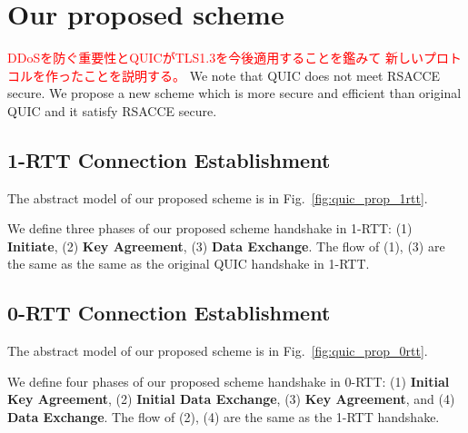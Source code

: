 \section{Our proposed scheme} \label{sec:proposed_scheme}

\textcolor{red} {
	DDoSを防ぐ重要性とQUICがTLS1.3を今後適用することを鑑みて
	新しいプロトコルを作ったことを説明する。
}
We note that QUIC does not meet RSACCE secure.
We propose a new scheme which is more secure and efficient
than original QUIC and it satisfy RSACCE secure.


\subsection{1-RTT Connection Establishment} \label{sec:quic_prop_1rtt}

The abstract model of our proposed scheme is in
Fig.~\ref{fig:quic_prop_1rtt}.



We define three phases of our proposed scheme handshake in 1-RTT:
(1) \textbf{Initiate},
(2) \textbf{Key Agreement},
(3) \textbf{Data Exchange}.
The flow of (1), (3) are the same as the same as the original QUIC
handshake in 1-RTT.



\subsection{0-RTT Connection Establishment} \label{sec:quic_prop_0rtt}

The abstract model of our proposed scheme is in
Fig.~\ref{fig:quic_prop_0rtt}.



We define four phases of our proposed scheme handshake in 0-RTT:
(1) \textbf{Initial Key Agreement},
(2) \textbf{Initial Data Exchange},
(3) \textbf{Key Agreement}, and
(4) \textbf{Data Exchange}.
The flow of (2), (4) are the same as the 1-RTT
handshake.





